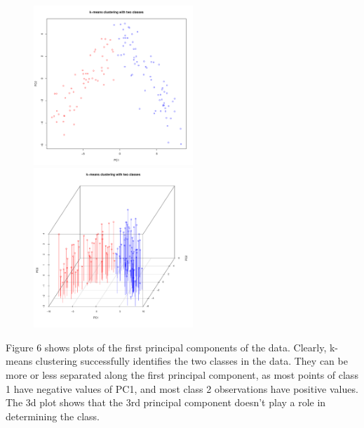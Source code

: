 \documentclass{article}
\begin{document}
\begin{figure}[h]				%
	\centering
	\includegraphics[width=6cm]{DA3/Plots/kmeans_2dplot.pdf}
	\includegraphics[width=6cm]{DA3/Plots/kmeans_3dplot.pdf}
	\caption{}
\end{figure}

Figure 6 shows plots of the first principal components of the data. Clearly, k-means clustering successfully identifies the two classes in the data. They can be more or less separated along the first principal component, as most points of class 1 have negative values of PC1, and most class 2 observations have positive values. The 3d plot shows that the 3rd principal component doesn't play a role in determining the class.
\end{document}
